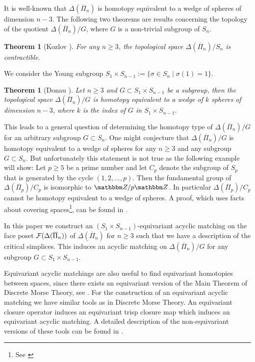 \documentclass{elsarticle}
\newtheorem{thm}[df]{Theorem}
\def\Z{\mathbbm Z}
\begin{document}
It is well-known that $\Delta(\overline{\Pi}_n)$ is homotopy equivalent to a wedge of spheres of dimension $n-3$. The following two theorems are results concerning the topology of the quotient $\Delta(\overline{\Pi}_n)/G$, where $G$ is a non-trivial subgroup of $S_n$.
\begin{thm}[Kozlov \cite{clmap}]
For any $n\geq 3$, the topological space $\Delta(\overline{\Pi}_n)/S_n$ is contractible.
\end{thm}
We consider the Young subgroup $S_1\times S_{n-1}:=\{\sigma\in S_n\mid\sigma(1)=1\}$.
\begin{thm}[Donau \cite{donau}]
\label{rdthm}
Let $n\geq3$ and $G\subset S_1\times S_{n-1}$ be a subgroup, then the topological space $\Delta(\overline{\Pi}_n)/G$ is homotopy equivalent to a wedge of $k$ spheres of dimension $n-3$, where $k$ is the index of $G$ in $S_1\times S_{n-1}$.
\end{thm}
This leads to a general question of determining the homotopy type of $\Delta(\overline{\Pi}_n)/G$ for an arbitrary subgroup $G\subset S_n$. One might conjecture that $\Delta(\overline{\Pi}_n)/G$ is homotopy equivalent to a wedge of spheres for any $n\geq 3$ and any subgroup $G\subset S_n$. But unfortunately this statement is not true as the following example will show: Let $p\geq 5$ be a prime number and let $C_p$ denote the subgroup of $S_p$ that is generated by the cycle $(1,2,\dots,p)$. Then the fundamental group of $\Delta(\overline{\Pi}_p)/C_p$ is isomorphic to $\Z/p\Z$. In particular $\Delta(\overline{\Pi}_p)/C_p$ cannot be homotopy equivalent to a wedge of spheres. A proof, which uses facts about covering spaces\footnote{See \cite[Chapter 1.3]{hatcher}}, can be found in \cite{torsion}.


In this paper we construct an $(S_1\times S_{n-1})$-equivariant acyclic matching on the face poset ${\cal F}(\Delta(\overline{\Pi}_n))$ of $\Delta(\overline{\Pi}_n)$ for $n\geq 3$ such that we have a description of the critical simplices. This induces an acyclic matching on $\Delta(\overline{\Pi}_n)/G$ for any subgroup $G\subset S_1\times S_{n-1}$.

Equivariant acyclic matchings are also useful to find equivariant homotopies between spaces, since there exists an equivariant version of the Main Theorem of Discrete Morse Theory, see \cite{freij}. For the construction of an equivariant acyclic matching we have similar tools as in Discrete Morse Theory. An equivariant closure operator induces an equivariant trisp closure map which induces an equivariant acyclic matching. A detailed description of the non-equivariant versions of these tools can be found in \cite{clmap}.
\end{document}
